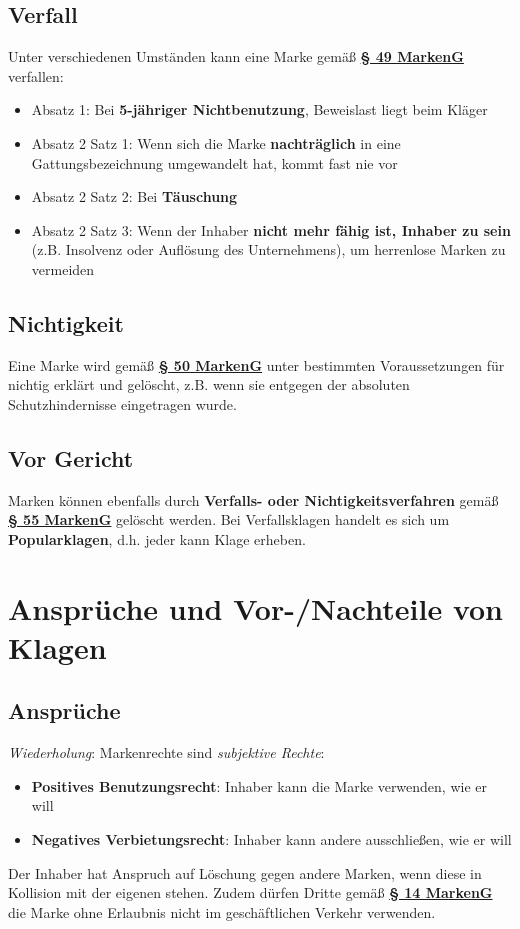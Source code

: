 \documentclass[12pt,A4]{extarticle}
\newcommand{\highlight}[1]{\textcolor{highlightColor}{\textbf{#1}}}
\newcommand{\markenG}[2][]{\textbf{\textcolor{markenGesetzLink}{\href{https://www.gesetze-im-internet.de/markeng/__#2.html}{§ #2 \ifthenelse{\equal{#1}{}}{}{#1 }MarkenG}}}}
\begin{document}
\subsection{Verfall}
Unter verschiedenen Umständen kann eine Marke gemäß \markenG{49} verfallen:
\begin{itemize}
  \item{Absatz 1: Bei \textbf{5-jähriger Nichtbenutzung}, Beweislast liegt beim Kläger}
  \item{Absatz 2 Satz 1: Wenn sich die Marke \textbf{nachträglich} in eine Gattungsbezeichnung umgewandelt hat, kommt fast nie vor}
  \item{Absatz 2 Satz 2: Bei \textbf{Täuschung}}
  \item{Absatz 2 Satz 3: Wenn der Inhaber \textbf{nicht mehr fähig ist, Inhaber zu sein} (z.B. Insolvenz oder Auflösung des Unternehmens), um herrenlose Marken zu vermeiden}
\end{itemize}

\subsection{Nichtigkeit}
Eine Marke wird gemäß \markenG{50} unter bestimmten Voraussetzungen für nichtig erklärt und gelöscht, z.B. wenn sie entgegen der absoluten Schutzhindernisse eingetragen wurde.

\subsection{Vor Gericht}
Marken können ebenfalls durch \textbf{Verfalls- oder Nichtigkeitsverfahren} gemäß \markenG{55} gelöscht werden. Bei Verfallsklagen handelt es sich um \highlight{Popularklagen}, d.h. jeder kann Klage erheben.

\section{Ansprüche und Vor-/Nachteile von Klagen}
\subsection{Ansprüche}
\textit{Wiederholung}: Markenrechte sind \textit{subjektive Rechte}:
\begin{itemize}
  \item{\textbf{Positives Benutzungsrecht}: Inhaber kann die Marke verwenden, wie er will}
  \item{\textbf{Negatives Verbietungsrecht}: Inhaber kann andere ausschließen, wie er will}
\end{itemize}
Der Inhaber hat Anspruch auf Löschung gegen andere Marken, wenn diese in Kollision mit der eigenen stehen. Zudem dürfen Dritte gemäß \markenG[Abs. 2]{14} die Marke ohne Erlaubnis nicht im geschäftlichen Verkehr verwenden.
\end{document}

